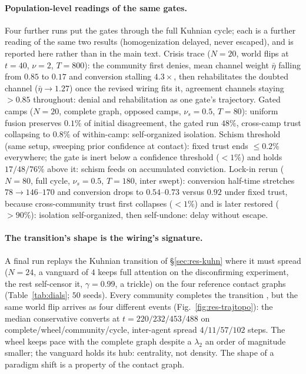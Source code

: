 \documentclass[runningheads]{llncs}
\begin{document}
\paragraph{Population-level readings of the same gates.}
Four further runs put the gates through the full Kuhnian cycle; each is a further reading of
the same two results (homogenization delayed, never escaped), and is reported here rather
than in the main text. Crisis trace ($N{=}20$, world flips at $t{=}40$, $\nu{=}2$,
$T{=}800$): the community first denies, mean channel weight $\bar\eta$ falling from
$0.85$ to $0.17$ and conversion stalling $4.3\times$, then rehabilitates the doubted
channel ($\bar\eta\to1.27$) once the revised wiring fits it, agreement channels staying
$>0.85$ throughout: denial and rehabilitation as one gate's trajectory. Gated camps
($N{=}20$, complete graph, opposed camps, $\nu_s{=}0.5$, $T{=}80$): uniform fusion preserves
$0.1\%$ of initial disagreement, the gated run $48\%$, cross-camp trust collapsing to
$0.8\%$ of within-camp: self-organized isolation. Schism threshold (same setup,
sweeping prior confidence at contact): fixed trust ends $\le0.2\%$ everywhere; the gate is
inert below a confidence threshold ($<1\%$) and holds $17/48/76\%$ above it: schism feeds
on accumulated conviction. Lock-in rerun ($N{=}80$, full cycle, $\nu_s{=}0.5$,
$T{=}180$, inter swept): conversion half-time stretches $78\to146$--$170$ and
conversion drops to $0.54$--$0.73$ versus $0.92$ under fixed trust, because cross-community
trust first collapses ($<1\%$) and is later restored ($>90\%$): isolation self-organized,
then self-undone: delay without escape.

\paragraph{The transition's shape is the wiring's signature.}
A final run replays the Kuhnian transition of \S\ref{sec:res-kuhn} where it must
spread ($N{=}24$, a vanguard of $4$ keeps full attention on the disconfirming
experiment, the rest self-censor it, $\gamma{=}0.99$, a trickle) on the four
reference contact graphs (Table~\ref{tab:dials}; $50$ seeds). Every community
completes the transition \citep{zollman2010}, but the same world flip arrives
as four different events (Fig.~\ref{fig:res-trajtopo}): the median conservative
converts at $t{=}220/232/453/488$ on complete/wheel/community/cycle, inter-agent
spread $4/11/57/102$ steps. The wheel keeps pace with the complete graph despite a
$\lambda_2$ an order of magnitude smaller; the vanguard holds its hub: centrality,
not density. The shape of a paradigm shift is a property of the contact graph.
\end{document}
